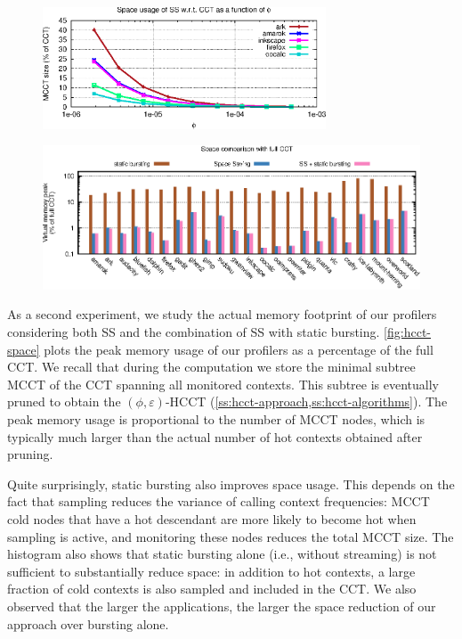 \ifdefined\noauthorea
\begin{figure}[!ht]
\begin{center}
\includegraphics[width=0.75\textwidth]{figures/hcct-space-by-phi/hcct-space-by-phi.eps}
\caption{\protect}
\end{center}
\end{figure}
\fi

\ifdefined\noauthorea
\begin{figure}[!ht]
\begin{center}
\includegraphics[width=\textwidth]{figures/hcct-space/hcct-space.eps}
\caption{\protect}
\end{center}
\end{figure}
\fi

As a second experiment, we study the actual memory footprint of our profilers considering both SS and the combination of SS with static bursting. \myfigure\ref{fig:hcct-space} plots the peak memory usage of our profilers as a percentage of the full CCT. We recall that during the computation we store the minimal subtree MCCT of the CCT spanning all monitored contexts. This subtree is eventually pruned to obtain the $(\phi,\varepsilon)$-HCCT (\mysection\ref{ss:hcct-approach,ss:hcct-algorithms}). The peak memory usage is proportional to the number of MCCT nodes, which is typically much larger than the actual number of hot contexts obtained after pruning.

Quite surprisingly, static bursting also improves space usage. This depends on the fact that sampling reduces the variance of calling context frequencies: MCCT cold nodes that have a hot descendant are more likely to become hot when sampling is active, and monitoring these nodes reduces the total MCCT size. The histogram also shows that static bursting alone (i.e., without streaming) is not sufficient to substantially reduce space: in addition to hot contexts, a large fraction of cold contexts is also sampled and included in the CCT. We also observed that the larger the applications, the larger the space reduction of our approach over bursting alone.


